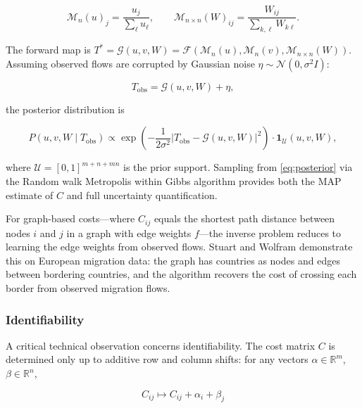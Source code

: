 \documentclass[12pt]{article}
\begin{document}
\begin{equation}
\mathcal{M}_n(u)_j = \frac{u_j}{\sum_\ell u_\ell}, \qquad \mathcal{M}_{n\times n}(W)_{ij} = \frac{W_{ij}}{\sum_{k,\ell} W_{k\ell}}.
\label{eq:normalization}
\end{equation}

The forward map is $T^* = \mathcal{G}(u, v, W) = \mathcal{F}(\mathcal{M}_n(u), \mathcal{M}_n(v), \mathcal{M}_{n\times n}(W))$. Assuming observed flows are corrupted by Gaussian noise $\eta \sim \mathcal{N}(0, \sigma^2 I)$:

\begin{equation}
T_{\mathrm{obs}} = \mathcal{G}(u, v, W) + \eta,
\label{eq:noise_model}
\end{equation}

the posterior distribution is

\begin{equation}
P(u, v, W \mid T_{\mathrm{obs}}) \propto \exp\!\left(-\frac{1}{2\sigma^2}\left|T_{\mathrm{obs}} - \mathcal{G}(u, v, W)\right|^2\right) \cdot \mathbf{1}_{\mathcal{U}}(u, v, W),
\label{eq:posterior}
\end{equation}

where $\mathcal{U} = [0,1]^{m+n+mn}$ is the prior support. Sampling from \eqref{eq:posterior} via the Random walk Metropolis within Gibbs algorithm provides both the MAP estimate of $C$ and full uncertainty quantification.

For graph-based costs---where $C_{ij}$ equals the shortest path distance between nodes $i$ and $j$ in a graph with edge weights $f$---the inverse problem reduces to learning the edge weights from observed flows. Stuart and Wolfram demonstrate this on European migration data: the graph has countries as nodes and edges between bordering countries, and the algorithm recovers the cost of crossing each border from observed migration flows.

\subsubsection{Identifiability}

A critical technical observation concerns identifiability. The cost matrix $C$ is determined only up to additive row and column shifts: for any vectors $\alpha \in \mathbb{R}^m$, $\beta \in \mathbb{R}^n$,

\begin{equation}
C_{ij} \mapsto C_{ij} + \alpha_i + \beta_j
\label{eq:gauge_freedom}
\end{equation}
\end{document}
